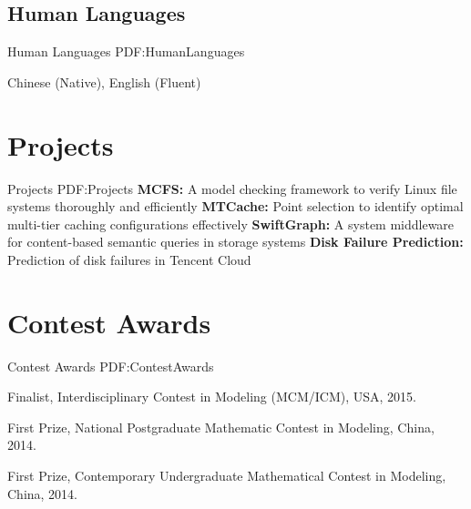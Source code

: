 \documentclass[letterpaper,10pt,oneside]{article}
\newcommand{\CVNote}{CV updated on {\DatestampYM{2021}{05}} }
\begin{document}
\begin{body}
\subsection
{Human Languages}
{Human Languages}
{PDF:HumanLanguages}

\BulletItem
Chinese (Native), English (Fluent)
\GapNoBreak

\section
{Projects}
{Projects}
{PDF:Projects}
\BulletItem
\textbf{MCFS: }A model checking framework to verify Linux file systems thoroughly and efficiently
\BulletItem
\textbf{MTCache: }Point selection to identify optimal multi-tier caching configurations effectively
\BulletItem
\textbf{SwiftGraph: }A system middleware for content-based semantic queries in storage systems
\BulletItem
\textbf{Disk Failure Prediction: }Prediction of disk failures in Tencent Cloud


\section
{Contest Awards}
{Contest Awards}
{PDF:ContestAwards}

\BulletItem
Finalist, Interdisciplinary Contest in Modeling (MCM/ICM), USA, 2015.

\BulletItem
First Prize, National Postgraduate Mathematic Contest in Modeling, China, 2014.

\BulletItem
First Prize, Contemporary Undergraduate Mathematical Contest in Modeling, China, 2014.













\end{body}



\label{LastPage}~
\end{document}
